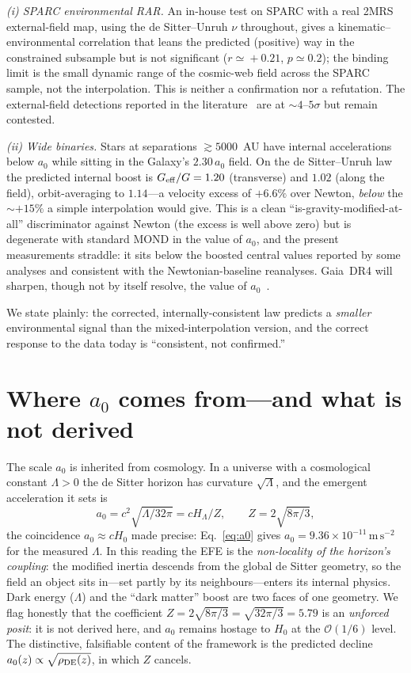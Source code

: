 \documentclass[aps,prd,twocolumn,10pt,nofootinbib]{revtex4-2}
\begin{document}
\emph{(i) SPARC environmental RAR.} An in-house test on SPARC with a real 2MRS external-field map, using the
de Sitter--Unruh $\nu$ throughout, gives a kinematic--environmental correlation that leans the predicted
(positive) way in the constrained subsample but is not significant ($r\!\simeq\!+0.21$, $p\!\simeq\!0.2$); the
binding limit is the small dynamic range of the cosmic-web field across the SPARC sample, not the interpolation.
This is neither a confirmation nor a refutation. The external-field detections reported in the
literature~\cite{Chae2021} are at $\sim\!4$--$5\sigma$ but remain contested.

\emph{(ii) Wide binaries.} Stars at separations $\gtrsim\!5000$~AU have internal accelerations below $a_0$ while
sitting in the Galaxy's $2.30\,a_0$ field. On the de Sitter--Unruh law the predicted internal boost is
$G_{\rm eff}/G=1.20$ (transverse) and $1.02$ (along the field), orbit-averaging to $1.14$---a velocity excess of
$+6.6\%$ over Newton, \emph{below} the $\sim+15\%$ a simple interpolation would give. This is a clean
``is-gravity-modified-at-all'' discriminator against Newton (the excess is well above zero) but is degenerate with
standard MOND in the value of $a_0$, and the present measurements straddle: it sits below the boosted central
values reported by some analyses and consistent with the Newtonian-baseline reanalyses. Gaia~DR4 will sharpen,
though not by itself resolve, the value of $a_0$~\cite{Banik2024}.

We state plainly: the corrected, internally-consistent law predicts a \emph{smaller} environmental signal than the
mixed-interpolation version, and the correct response to the data today is ``consistent, not confirmed.''

\section{Where $a_0$ comes from---and what is not derived}
The scale $a_0$ is inherited from cosmology. In a universe with a cosmological constant $\Lambda>0$ the de Sitter
horizon has curvature $\sqrt{\Lambda}$, and the emergent acceleration it sets is
\begin{equation}
a_0=c^2\sqrt{\Lambda/32\pi}=cH_\Lambda/Z,\qquad Z=2\sqrt{8\pi/3},
\label{eq:a0}
\end{equation}
the coincidence $a_0\!\approx\!cH_0$ made precise: Eq.~\eqref{eq:a0} gives $a_0=9.36\times10^{-11}\,\mathrm{m\,
s^{-2}}$ for the measured $\Lambda$. In this reading the EFE is the \emph{non-locality of the horizon's coupling}:
the modified inertia descends from the global de Sitter geometry, so the field an object sits in---set partly by
its neighbours---enters its internal physics. Dark energy ($\Lambda$) and the ``dark matter'' boost are two faces
of one geometry. We flag honestly that the coefficient $Z=2\sqrt{8\pi/3}=\sqrt{32\pi/3}=5.79$ is an \emph{unforced
posit}: it is not derived here, and $a_0$ remains hostage to $H_0$ at the $\mathcal{O}(1/6)$ level. The
distinctive, falsifiable content of the framework is the predicted decline $a_0(z)\propto\sqrt{\rho_{\rm DE}(z)}$,
in which $Z$ cancels.
\end{document}
